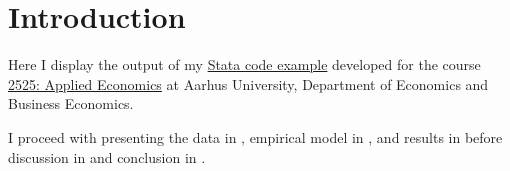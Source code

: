 \section{Introduction}
\label{s:intro}
Here I display the output of my \href{https://GitHub.com/ThorNoe/Stata_example}{Stata code example} developed for the course \href{https://kursuskatalog.au.dk/en/course/116211/2525-Applied-Economics}{2525: Applied Economics} at Aarhus University, Department of Economics and Business Economics.









I proceed with presenting the data in , empirical model in , and results in  before discussion in  and conclusion in .
